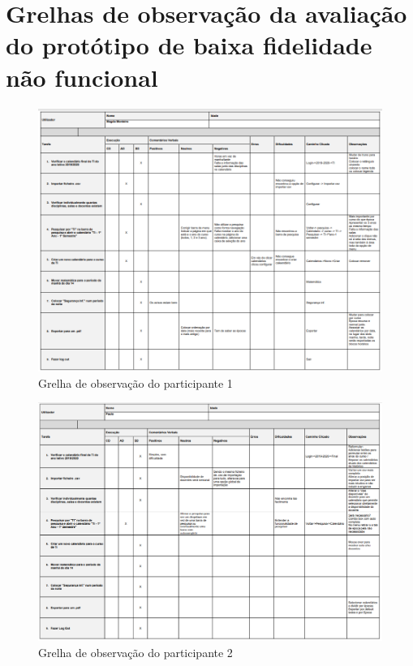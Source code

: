 \documentclass[11pt, twoside]{report}
\begin{document}
	\section*{Grelhas de observação da avaliação do protótipo de baixa fidelidade não funcional}
		\begin{landscape}
		\clearpage
			\pagestyle{empty}
			\begin{figure}[H] 
				\centering 							\includegraphics[width=1.23\textwidth,height=1.23\textheight,keepaspectratio]{image/testes_prototipo_baixo_fidelidade/grelha_observadores_magda}
				\caption{Grelha de observação do participante 1}
				
			\end{figure}
			\begin{figure}[H] 
				\centering 							\includegraphics[width=1.4\textwidth,height=1.4\textheight,keepaspectratio]{image/testes_prototipo_baixo_fidelidade/grelha_observadores_paulo}
				\caption{Grelha de observação do participante 2}
				
			\end{figure}
		\end{landscape}
\end{document}

